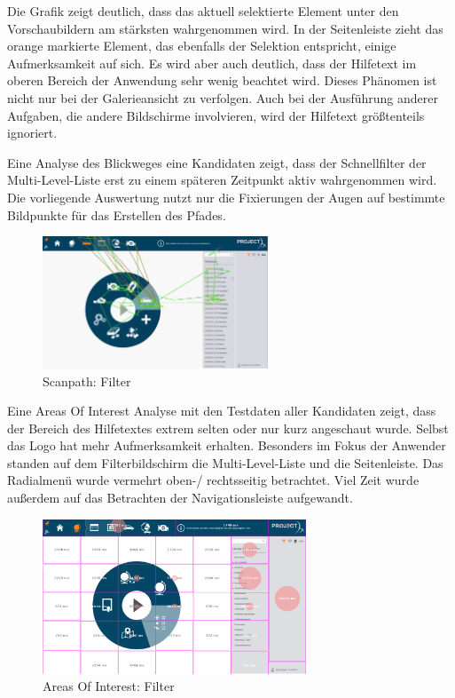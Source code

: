 Die Grafik zeigt deutlich, dass das aktuell selektierte Element unter den Vorschaubildern am stärksten wahrgenommen wird. In der Seitenleiste zieht das orange markierte Element, das ebenfalls der Selektion entspricht, einige Aufmerksamkeit auf sich. Es wird aber auch deutlich, dass der Hilfetext im oberen Bereich der Anwendung sehr wenig beachtet wird. Dieses Phänomen ist nicht nur bei der Galerieansicht zu verfolgen. Auch bei der Ausführung anderer Aufgaben, die andere Bildschirme involvieren, wird der Hilfetext größtenteils ignoriert.\par
Eine Analyse des Blickweges eine Kandidaten zeigt, dass der Schnellfilter der Multi-Level-Liste erst zu einem späteren Zeitpunkt aktiv wahrgenommen wird. Die vorliegende Auswertung nutzt nur die Fixierungen der Augen auf bestimmte Bildpunkte für das Erstellen des Pfades.\par
\begin{figure}[H]
 \centering
 \includegraphics[width=0.6\textwidth]{grafiken/scanpath.png}
 \caption{Scanpath: Filter}
 \label{fig:scanFilter}
\end{figure}
Eine Areas Of Interest Analyse mit den Testdaten aller Kandidaten zeigt, dass der Bereich des Hilfetextes extrem selten oder nur kurz angeschaut wurde. Selbst das Logo hat mehr Aufmerksamkeit erhalten. Besonders im Fokus der Anwender standen auf dem Filterbildschirm die Multi-Level-Liste und die Seitenleiste. Das Radialmenü wurde vermehrt oben-/ rechtsseitig betrachtet. Viel Zeit wurde außerdem auf das Betrachten der Navigationsleiste aufgewandt.
\begin{figure}[H]
 \centering
 \includegraphics[width=0.7\textwidth]{grafiken/areas_of_interest_filter.png}
 \caption{Areas Of Interest: Filter}
 \label{fig:aoiFIlter}
\end{figure}
